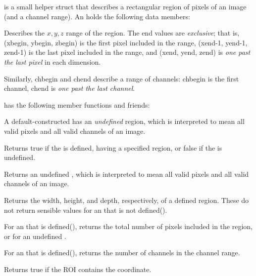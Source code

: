 \ROI is a small helper struct that describes a rectangular region of
pixels of an image (and a channel range).  An \ROI holds the following
data members:

Describes the $x, y, z$ range of the region.  The {\cf end} values are
\emph{exclusive}; that is, ({\cf xbegin, ybegin, zbegin}) is the first
pixel included in the range, ({\cf xend-1, yend-1, zend-1}) is the last
pixel included in the range, and ({\cf xend, yend, zend}) is \emph{one
past the last pixel} in each dimension.

Similarly, {\cf chbegin} and {\cf chend} describe a range of channels:
{\cf chbegin} is the first channel, {\cf chend} is \emph{one past the last
channel}.
\apiend

\smallskip

\noindent \ROI has the following member functions and friends:

\smallskip

A default-constructed \ROI has an \emph{undefined} region, which
is interpreted to mean all valid pixels and all valid channels of
an image.
\apiend

Returns {\cf true} if the \ROI is defined, having a specified region,
or {\cf false} if the \ROI is undefined.
\apiend

Returns an undefined \ROI, which is interpreted to mean all valid pixels
and all valid channels of an image.
\apiend

Returns the width, height, and depth, respectively, of a defined region.
These do not return sensible values for an \ROI that is not {\cf defined()}.
\apiend

For an \ROI that is {\cf defined()}, returns the total number of pixels
included in the region, or {} for an undefined \ROI.
\apiend

For an \ROI that is {\cf defined()}, returns the number of channels
in the channel range.
\apiend

\NEW %
Returns {\cf true} if the ROI contains the coordinate.
\apiend


